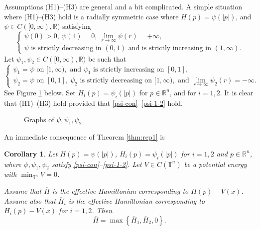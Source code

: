 \documentclass[12pt,reqno]{amsart}
\theoremstyle{plain}
\newtheorem{cor}[thm]{Corollary}
\theoremstyle{remark}
\numberwithin{equation}{section}
\newcommand{\R}{\mathbb{R}}
\newcommand{\T}{\mathbb{T}}
\newcommand{\ol}{\overline}
\begin{document}
Assumptions (H1)--(H3) are general and a bit complicated.
A simple situation where (H1)--(H3) hold is a radially symmetric case where $H(p)=\psi(|p|)$,
and  $\psi \in C([0,\infty), \R)$ satisfying
\begin{equation}\label{psi-con}
\begin{cases}
\psi(0)>0, \ \psi(1)=0, \  \lim_{r \to \infty} \psi(r)=+\infty,\\
\psi \text{ is strictly decreasing in $(0,1)$ and is strictly increasing in $(1,\infty)$}.
\end{cases}
\end{equation}
Let $\psi_1, \psi_2 \in C([0,\infty), \R)$ be such that
\begin{equation}\label{psi-1-2}
\begin{cases}
\psi_1=\psi  \text{ on } [1,\infty), \text{ and } \psi_1 \text{ is strictly increasing on } [0,1],\\
\psi_2=\psi \text{ on } [0,1], \ \psi_2  \text{ is strictly decreasing on } [1,\infty), \text{ and } \lim_{r \to \infty} \psi_2(r)=-\infty.
\end{cases}
\end{equation}
See Figure \ref{fig1} below.   Set $H_i(p)= \psi_i(|p|)$ for $p \in \R^n$, and for $i=1,2$.
It is clear that (H1)--(H3) hold provided that \eqref{psi-con}--\eqref{psi-1-2} hold.
\begin{figure}[h]
\begin{center}
\caption{Graphs of $\psi, \psi_1, \psi_2$}
\label{fig1}
\end{center}
\end{figure}
An immediate consequence of Theorem \ref{thm:rep1} is
\begin{cor}\label{cor:rep1}
Let $H(p)=\psi(|p|)$, $H_i(p)=\psi_i(|p|)$ for $i=1,2$ and $p \in \R^n$,
where $\psi,\psi_1,\psi_2$ satisfy \eqref{psi-con}--\eqref{psi-1-2}.
Let $V \in C(\T^n)$ be a potential energy with $\min_{\T^n} V=0$.

Assume that $\ol{H}$ is the effective Hamiltonian corresponding to $H(p)-V(x)$.
Assume also that $\ol{H}_i$ is the effective Hamiltonian corresponding to $H_i(p)- V(x)$ for $i=1,2$.
Then
\[
\ol{H} = \max\left\{\ol{H}_1, \ol{H}_2,0\right\}.
\]
\end{cor}
\end{document}
